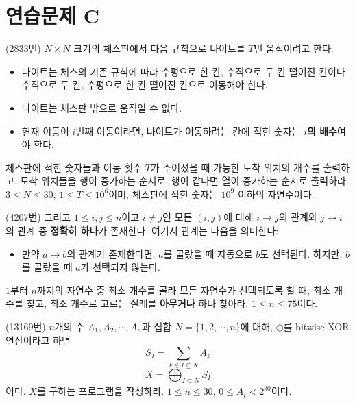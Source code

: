 \section{연습문제 C}

\begin{problem}
    (2833번) $N \times N$ 크기의 체스판에서 다음 규칙으로 나이트를 $T$번 움직이려고 한다.
    \begin{itemize}
        \item 나이트는 체스의 기존 규칙에 따라 수평으로 한 칸, 수직으로 두 칸 떨어진 칸이나 수직으로 두 칸, 수평으로 한 칸 떨어진 칸으로 이동해야 한다.
        \item 나이트는 체스판 밖으로 움직일 수 없다.
        \item 현재 이동이 $i$번째 이동이라면, 나이트가 이동하려는 칸에 적힌 숫자는 \textbf{$i$의 배수}여야 한다.
    \end{itemize}
    체스판에 적힌 숫자들과 이동 횟수 $T$가 주어졌을 때 가능한 도착 위치의 개수를 출력하고, 도착 위치들을 행이 증가하는 순서로, 행이 같다면 열이 증가하는 순서로 출력하라. $3 \leq N \leq 30$, $1 \leq T \leq 10^6$이며, 체스판에 적힌 숫자는 $10^9$ 이하의 자연수이다.
\end{problem}

\begin{problem}
    (4207번) 그리고 $1 \leq i, j \leq n$이고 $i \neq j$인 모든 $(i, j)$에 대해 $i \rightarrow j$의 관계와 $j \rightarrow i$의 관계 중 \textbf{정확히 하나}가 존재한다. 여기서 관계는 다음을 의미한다:
    \begin{itemize}
        \item 만약 $a \rightarrow b$의 관계가 존재한다면, $a$를 골랐을 때 자동으로 $b$도 선택된다. 하지만, $b$를 골랐을 때 $a$가 선택되지 않는다.
    \end{itemize}
    $1$부터 $n$까지의 자연수 중 최소 개수를 골라 모든 자연수가 선택되도록 할 때, 최소 개수를 찾고, 최소 개수로 고르는 실례를 \textbf{아무거나} 하나 찾아라. $1 \leq n \leq 75$이다.
\end{problem}

\begin{problem}
    (13169번) $n$개의 수 $A_1, A_2, \cdots, A_n$과 집합 $N = \{ 1, 2, \cdots, n \}$에 대해, $\oplus$를 bitwise XOR 연산이라고 하면
    $$S_I = \sum_{k \in I \subseteq N} {A_k}$$
    $$X = \bigoplus_{I \subseteq N} {S_I}$$
    이다. $X$를 구하는 프로그램을 작성하라. $1 \leq n \leq 30$, $0 \leq A_i < 2^{30}$이다.
\end{problem}

